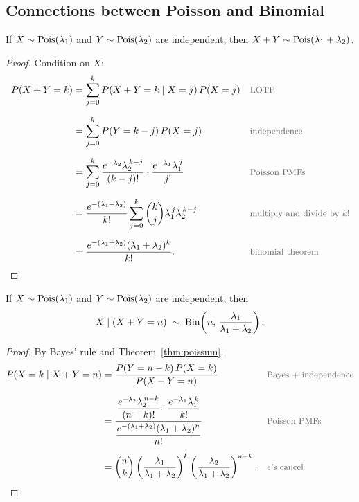 \bigskip

\subsection{Connections between Poisson and Binomial}

\bigskip

\begin{theorem}\label{thm:poissum}
If $X \sim \operatorname{Pois}(\lambda_1)$ and $Y \sim \operatorname{Pois}(\lambda_2)$ are independent, then $X + Y \sim \operatorname{Pois}(\lambda_1 + \lambda_2)$.
\end{theorem}

\medskip

\begin{proof}
Condition on $X$:
\medskip
\begin{align*}
P(X + Y = k)
  &= \sum_{j=0}^{k} P(X + Y = k \mid X = j)\,P(X = j)
  && \by{LOTP} \\[0.6em]
  &= \sum_{j=0}^{k} P(Y = k - j)\,P(X = j)
  && \by{independence} \\[0.6em]
  &= \sum_{j=0}^{k} \frac{e^{-\lambda_2}\lambda_2^{\,k-j}}{(k-j)!} \cdot \frac{e^{-\lambda_1}\lambda_1^{\,j}}{j!}
  && \by{Poisson PMFs} \\[0.6em]
  &= \frac{e^{-(\lambda_1 + \lambda_2)}}{k!} \sum_{j=0}^{k} \binom{k}{j} \lambda_1^{\,j} \lambda_2^{\,k-j}
  && \by{multiply and divide by $k!$} \\[0.6em]
  &= \frac{e^{-(\lambda_1 + \lambda_2)}(\lambda_1 + \lambda_2)^{k}}{k!}.
  && \by{binomial theorem}
\end{align*}
\end{proof}

\bigskip

\begin{theorem}\label{thm:poiscond}
If $X \sim \operatorname{Pois}(\lambda_1)$ and $Y \sim \operatorname{Pois}(\lambda_2)$ are independent, then
\medskip
\[
X \mid (X + Y = n) \;\sim\; \operatorname{Bin}\!\left(n,\, \frac{\lambda_1}{\lambda_1 + \lambda_2}\right).
\]
\end{theorem}

\medskip

\begin{proof}
By Bayes' rule and Theorem~\ref{thm:poissum},
\medskip
\begin{align*}
P(X = k \mid X + Y = n)
  &= \frac{P(Y = n - k)\,P(X = k)}{P(X + Y = n)}
  && \by{Bayes + independence} \\[0.6em]
  &= \frac{\dfrac{e^{-\lambda_2}\lambda_2^{\,n-k}}{(n-k)!} \cdot \dfrac{e^{-\lambda_1}\lambda_1^{\,k}}{k!}}{\dfrac{e^{-(\lambda_1+\lambda_2)}(\lambda_1+\lambda_2)^{n}}{n!}}
  && \by{Poisson PMFs} \\[0.6em]
  &= \binom{n}{k} \left(\frac{\lambda_1}{\lambda_1 + \lambda_2}\right)^{k} \left(\frac{\lambda_2}{\lambda_1 + \lambda_2}\right)^{n-k}.
  && \by{$e$'s cancel}
\end{align*}
\end{proof}

